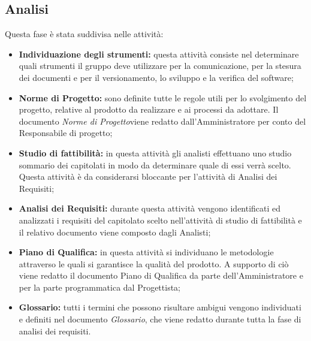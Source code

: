 \subsection{Analisi}
Questa fase è stata suddivisa nelle attività:
\begin{itemize}
	\item \textbf{Individuazione degli strumenti:} questa attività consiste nel determinare quali strumenti il gruppo deve utilizzare per la comunicazione, per la stesura dei documenti e per il versionamento, lo sviluppo e la verifica del software;
	\item \textbf{Norme di Progetto:} sono definite tutte le regole utili per lo svolgimento del progetto, relative al prodotto da realizzare e ai processi da adottare. Il documento \textit{Norme di Progetto}\doc viene redatto dall'Amministratore per conto del Responsabile di progetto;
	\item \textbf{Studio di fattibilità:} in questa attività gli analisti effettuano uno studio sommario dei capitolati in modo da determinare quale di essi verrà scelto. Questa attività è da considerarsi bloccante per l’attività di Analisi dei Requisiti;
	\item \textbf{Analisi dei Requisiti:} durante questa attività vengono identificati ed analizzati i requisiti del capitolato scelto nell'attività di studio di fattibilità e il relativo documento viene composto dagli Analisti;
	\item \textbf{Piano di Qualifica:} in questa attività si individuano le metodologie attraverso le quali si garantisce la qualità del prodotto. A supporto di ciò viene redatto il documento Piano di Qualifica da parte dell'Amministratore e per la parte programmatica dal Progettista;
	\item \textbf{Glossario:} tutti i termini che possono risultare ambigui vengono individuati e definiti nel documento \textit{Glossario}\docs, che viene redatto durante tutta la fase di analisi dei requisiti.
\end{itemize}
